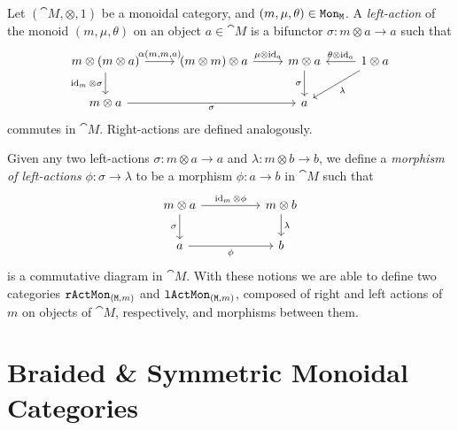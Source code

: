 \documentclass[../../deep-dive]{subfiles}
\begin{document}
\begin{definition}
    \label{def:monoid-actions}
    Let \((\cat M, \otimes, 1)\) be a monoidal category, and
    \((m, \mu, \theta) \in {\texttt{Mon}}_{\texttt M}\). A \emph{left-action} of the monoid
    \((m, \mu, \theta)\) on an object \(a \in \cat M\) is a bifunctor
    \(\sigma: m \otimes a \to a\) such that
    \[
        \begin{tikzcd}
            m \otimes (m \otimes a)
            \ar[r, "{\alpha(m, m, a)}"]
            \ar[d, "\Id_m \otimes \sigma"']
            &(m \otimes m) \otimes a
            \ar[r, "\mu \otimes \Id_a"]
            &m \otimes a
            \ar[d, "\sigma"']
            &1 \otimes a
            \ar[l, "\theta \otimes \Id_a"']
            \ar[ld, "\lambda"]
            \\
            m \otimes a \ar[rr, "\sigma"']
            &
            &a
            &
        \end{tikzcd}
    \]
    commutes in \(\cat M\). Right-actions are defined analogously.

    Given any two left-actions \(\sigma: m \otimes a \to a\) and
    \(\lambda: m \otimes b \to b\), we define a \emph{morphism of left-actions}
    \(\phi: \sigma \to \lambda\) to be a morphism \(\phi: a \to b\) in \(\cat M\)
    such that
    \[
        \begin{tikzcd}
            m \otimes a
            \ar[d, "\sigma"']
            \ar[rr, "\Id_m \otimes \phi"]
            &&m \otimes b \ar[d, "\lambda"]
            \\
            a \ar[rr, "\phi"']
            &&b
        \end{tikzcd}
    \]
    is a commutative diagram in \(\cat M\). With these notions we are able to define
    two categories \({\texttt{rActMon}}_{(\texttt M, m)}\) and \({\texttt{lActMon}}_{(\texttt M, m)}\),
    composed of right and left actions of \(m\) on objects of \(\cat M\),
    respectively, and morphisms between them.
\end{definition}

\section{Braided \& Symmetric Monoidal Categories}
\end{document}
